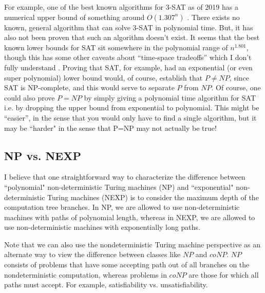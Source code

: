 \documentclass[10pt,a4paper]{article}
\begin{document}
For example, one of the best known algorithms for 3-SAT as of 2019 has a numerical upper bound of something around $O(1.307^n)$ \cite{2019fasterkSAT}. There exists no known, general algorithm that can solve 3-SAT in polynomial time. But, it has also not been proven that such an algorithm doesn't exist. It seems that the best known lower bounds for SAT sit somewhere in the polynomial range of $n^{1.801}$, though this has some other caveats about ``time-space tradeoffs'' which I don't fully understand \cite{SE3satlowerbounds}. Proving that SAT, for example, had an exponential (or even super polynomial) lower bound would, of course, establish that $P \neq NP$, since SAT is NP-complete, and this would serve to separate $P$ from $NP$. Of course, one could also prove $P=NP$ by simply giving a polynomial time algorithm for SAT i.e. by dropping the upper bound from exponential to polynomial. This might be ``easier'', in the sense that you would only have to find a single algorithm, but it may be ``harder" in the sense that P=NP may not actually be true!

\subsection{NP vs. NEXP}

I believe that one straightforward way to characterize the difference between ``polynomial" non-deterministic Turing machines (NP) and ``exponential" non-deterministic Turing machines (NEXP) is to consider the maximum depth of the computation tree branches. In NP, we are allowed to use non-deterministic machines with paths of polynomial length, whereas in NEXP, we are allowed to use non-deterministic machines with exponentially long paths.

Note that we can also use the nondeterministic Turing machine perspective as an alternate way to view the difference between classes like $NP$ and $coNP$. $NP$ consists of problems that have some accepting path out of all branches on the nondeterministic computation, whereas problems in $coNP$ are those for which all paths must accept. For example, satisfiability vs. unsatisfiability.







\end{document}
